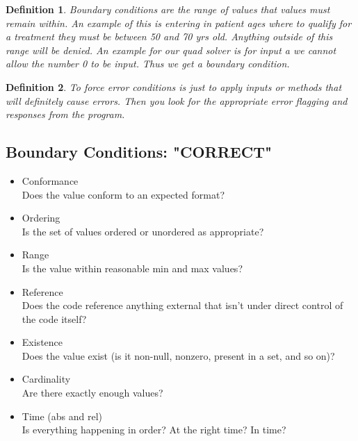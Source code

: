 \documentclass{report}
\newtheorem*{defn}{Definition}
\begin{document}
\begin{defn}
Boundary conditions are the range of values that values must remain within. An example of this is entering in patient ages where to qualify for a treatment they must be between 50 and 70 yrs old. Anything outside of this range will be denied. An example for our quad solver is for input a we cannot allow the number 0 to be input. Thus we get a boundary condition.
\end{defn}

\begin{defn}
To force error conditions is just to apply inputs or methods that will definitely cause errors. Then you look for the appropriate error flagging and responses from the program.
\end{defn}

\subsection{Boundary Conditions: "CORRECT"}
\begin{itemize}
\item Conformance\\  Does the value conform to an expected format?
\item Ordering\\  Is the set of values ordered or unordered as appropriate?
\item Range\\  Is the value within reasonable min and max values?
\item Reference\\  Does the code reference anything external that isn't under direct control of the code itself?
\item Existence\\  Does the value exist (is it non-null, nonzero, present in a set, and so on)?
\item Cardinality\\  Are there exactly enough values?
\item Time (abs and rel)\\  Is everything happening in order? At the right time? In time?
\end{itemize}
\end{document}
